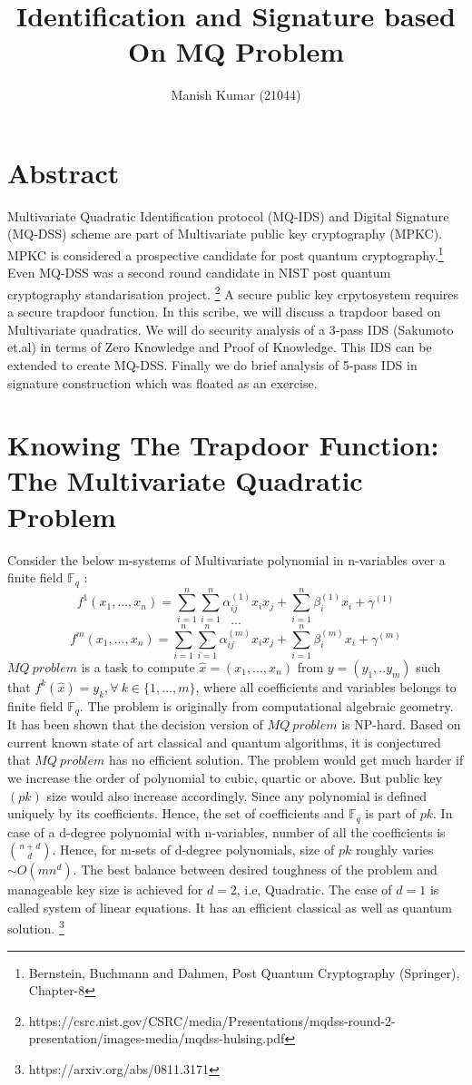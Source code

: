 \documentclass{article}
\title{Identification and Signature based On MQ Problem}
\author{Manish Kumar (21044)}
\begin{document}
\maketitle

\section*{Abstract} Multivariate Quadratic Identification protocol (MQ-IDS) and Digital Signature (MQ-DSS) scheme are part of Multivariate public key cryptography (MPKC). MPKC is considered a prospective candidate for post quantum cryptography.\footnote{Bernstein, Buchmann and Dahmen, Post Quantum Cryptography (Springer), Chapter-8} Even MQ-DSS was a second round candidate in NIST post quantum cryptography standarisation project.
\footnote{https://csrc.nist.gov/CSRC/media/Presentations/mqdss-round-2-presentation/images-media/mqdss-hulsing.pdf} A secure public key crpytosystem requires a secure trapdoor function. In this scribe, we will discuss a trapdoor based on Multivariate quadratics. We will do security analysis of a 3-pass IDS (Sakumoto et.al) in terms of Zero Knowledge and Proof of Knowledge. This IDS can be extended to create MQ-DSS. Finally we do brief analysis of 5-pass IDS in signature construction which was floated as an exercise. 
\section*{Knowing The Trapdoor Function: The Multivariate Quadratic Problem}
Consider the below m-systems of Multivariate polynomial in n-variables over a finite field $\mathbb{F}_q$ :
\[ f^{1}(x_1,...,x_n) = \sum_{i=1}^{n} \sum_{i=1}^{n} \alpha^{(1)}_{ij} x_i x_j + \sum_{i=1}^{n} \beta^{(1)}_i x_i +\gamma^{(1)} \]
\[ ... \]
\[ f^{m}(x_1,...,x_n) = \sum_{i=1}^{n} \sum_{i=1}^{n} \alpha^{(m)}_{ij} x_i x_j + \sum_{i=1}^{n} \beta^{(m)}_i x_i +\gamma^{(m)} \]
$MQ\ problem$ is a task to compute $\hat{x} = (x_1,...,x_n)$ from $y = (y_1,..y_m)$ such that $ f^{k}(\hat{x})=y_k, \forall\ k \in \{1,...,m\} $, where all coefficients and variables belongs to finite field $\mathbb{F}_q$. The problem is originally from computational algebraic geometry. It has been shown that the decision version of $MQ\ problem$ is NP-hard. Based on current known state of art classical and quantum algorithms, it is conjectured that $MQ\ problem$ has no efficient solution. The problem would get much harder if we increase the order of polynomial to cubic, quartic or above. But public key $(pk)$ size would also increase accordingly. Since any polynomial is defined uniquely by its coefficients. Hence, the set of coefficients and $\mathbb{F}_q$ is part of $pk$. In case of a d-degree polynomial with n-variables, number of all the coefficients is ${n+d \choose d}$. Hence, for m-sets of d-degree polynomials, size of $pk$ roughly varies $\sim O(mn^d)$. The best balance between desired toughness of the problem and manageable key size is achieved for $d=2$, i.e, Quadratic. The case of $d=1$ is called system of linear equations. It has an efficient classical as well as quantum solution. \footnote{https://arxiv.org/abs/0811.3171}
\end{document}

